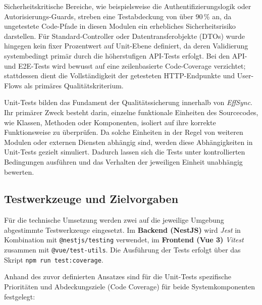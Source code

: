 Sicherheitskritische Bereiche, wie beispielsweise die Authentifizierungslogik oder Autorisierungs-Guards, streben eine Testabdeckung von über 90\,\% an, da ungetestete Code-Pfade in diesen Modulen ein erhebliches Sicherheitsrisiko darstellen. Für Standard-Controller oder Datentransferobjekte (DTOs) wurde hingegen kein fixer Prozentwert auf Unit-Ebene definiert, da deren Validierung systembedingt primär durch die höherstufigen API-Tests erfolgt. Bei den API- und E2E-Tests wird bewusst auf eine zeilenbasierte Code-Coverage verzichtet; stattdessen dient die Vollständigkeit der getesteten HTTP-Endpunkte und User-Flows als primäres Qualitätskriterium.

\label{sec:unit_tests}
Unit-Tests bilden das Fundament der Qualitätssicherung innerhalb von \textit{EffSync}. Ihr primärer Zweck besteht darin, einzelne funktionale Einheiten des Sourcecodes, wie Klassen, Methoden oder Komponenten, isoliert auf ihre korrekte Funktionsweise zu überprüfen. Da solche Einheiten in der Regel von weiteren Modulen oder externen Diensten abhängig sind, werden diese Abhängigkeiten in Unit-Tests gezielt simuliert. Dadurch lassen sich die Tests unter kontrollierten Bedingungen ausführen und das Verhalten der jeweiligen Einheit unabhängig bewerten.

\subsection{Testwerkzeuge und Zielvorgaben}
Für die technische Umsetzung werden zwei auf die jeweilige Umgebung abgestimmte Testwerkzeuge eingesetzt. Im \textbf{Backend (NestJS)} wird \textit{Jest} in Kombination mit \texttt{@nestjs/testing} verwendet\cite{nestjs_testing_docs}, im \textbf{Frontend (Vue 3)} \textit{Vitest}\cite{vitest_docs} zusammen mit \texttt{@vue/test-utils}\cite{vue_test_utils_docs}. Die Ausführung der Tests erfolgt über das Skript \texttt{npm run test:coverage}.

Anhand des zuvor definierten Ansatzes sind für die Unit-Tests spezifische Prioritäten und Abdeckungsziele (Code Coverage) für beide Systemkomponenten festgelegt:

